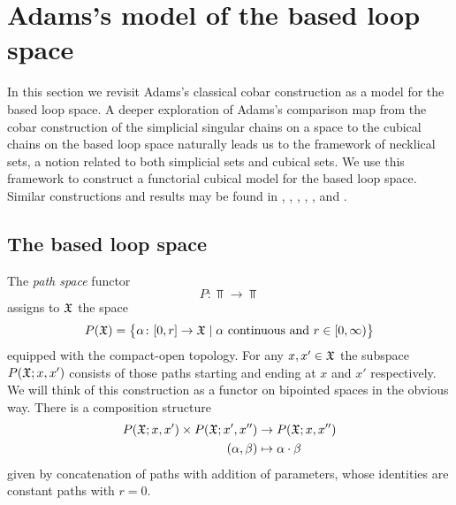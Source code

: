 
\section{Adams's model of the based loop space}\label{s:theorem1}

In this section we revisit Adams's classical cobar construction as a model for the based loop space.
A deeper exploration of Adams's comparison map from the cobar construction of the simplicial singular chains on a space to the cubical chains on the based loop space naturally leads us to the framework of necklical sets, a notion related to both simplicial sets and cubical sets.
We use this framework to construct a functorial cubical model for the based loop space.
Similar constructions and results may be found in \cite{baues1980geometry}, \cite{berger1995loops}, \cite{baues1998hopf}, \cite{dugger2011rigidification}, \cite{galvez2020hopf}, and \cite{rivera2018cubical, rivera2019path}.

%

\subsection{The based loop space}

The \textit{path space} functor
\[
P \colon \Top \to \Top
\]
assigns to $\mathfrak{X}$ the space
\[
P(\mathfrak{X}) = \big\{\alpha \colon [0,r] \to \mathfrak{X} \mid \text{$\alpha$ continuous and } r \in [0,\infty)\big\}
\]
equipped with the compact-open topology.
For any $x,x' \in \mathfrak{X}$ the subspace $P(\mathfrak{X};x,x')$ consists of those paths starting and ending at $x$ and $x'$ respectively.
We will think of this construction as a functor on bipointed spaces in the obvious way.
There is a composition structure
\begin{equation}\label{eq:composition structure}
	\begin{split}
		P(\mathfrak{X};x,x') \times P(\mathfrak{X};x',x'') &\to P(\mathfrak{X};x,x'') \\
		(\alpha, \beta) &\mapsto \alpha \cdot \beta
	\end{split}
\end{equation}
given by concatenation of paths with addition of parameters, whose identities are constant paths with $r=0$.

